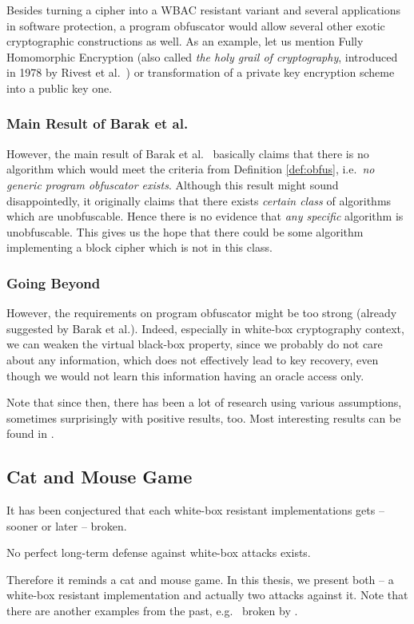 	Besides turning a cipher into a WBAC resistant variant and several applications in software protection, a program obfuscator would allow several other exotic cryptographic constructions as well. As an example, let us mention Fully Homomorphic Encryption (also called {\em the holy grail of cryptography}, introduced in 1978 by Rivest et al.\ \cite{rivest1978data}) or transformation of a private key encryption scheme into a public key one.

\subsubsection{Main Result of Barak et al.}
	
	However, the main result of Barak et al.\ \cite{barak2001possibility} basically claims that there is no algorithm which would meet the criteria from Definition \ref{def:obfus}, i.e.\ {\em no generic program obfuscator exists}. Although this result might sound disappointedly, it originally claims that there exists {\em certain class} of algorithms which are unobfuscable. Hence there is no evidence that {\em any specific} algorithm is unobfuscable. This gives us the hope that there could be some algorithm implementing a block cipher which is not in this class.

\subsubsection{Going Beyond}
	
	However, the requirements on program obfuscator might be too strong (already suggested by Barak et al.). Indeed, especially in white-box cryptography context, we can weaken the virtual black-box property, since we probably do not care about any information, which does not effectively lead to key recovery, even though we would not learn this information having an oracle access only.
	
	Note that since then, there has been a lot of research using various assumptions, sometimes surprisingly with positive results, too. Most interesting results can be found in \cite{barak2014protecting, brakerski2014virtual}.



\subsection{Cat and Mouse Game}
\label{sec:catmouse}

It has been conjectured that each white-box resistant implementations gets -- sooner or later -- broken.
\begin{conj}
	No perfect long-term defense against white-box attacks exists.
\end{conj}
Therefore it reminds a cat and mouse game. In this thesis, we present both -- a white-box resistant implementation and actually two attacks against it. Note that there are another examples from the past, e.g.\ \cite{chow2002des} broken by \cite{jacob2002attacking}.
